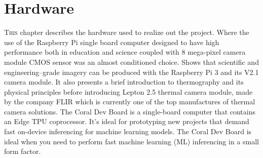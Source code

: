 \chapter{Hardware}
\label{chap:hardware}
\lettrine[lines=3]{T}{his} chapter describes the hardware used to realize out
the project. Where the use of the Raspberry Pi single board computer designed to
have high performance both in education and science coupled with 8 mega-pixel
camera module CMOS sensor was an almost conditioned choice. Shows that
scientific and engineering--grade imagery can be produced with the Raspberry Pi
3 and its V2.1 camera module. It also presents a brief introduction to
thermography and its physical principles before introducing Lepton 2.5 thermal
camera module, made by the company FLIR which is currently one of the top
manufactures of thermal camera solutions. The Coral Dev Board is a single-board
computer that contains an Edge TPU coprocessor. It's ideal for prototyping new
projects that demand fast on-device inferencing for machine learning models. The
Coral Dev Board is ideal when you need to perform fast machine learning (ML)
inferencing in a small form factor.
%





